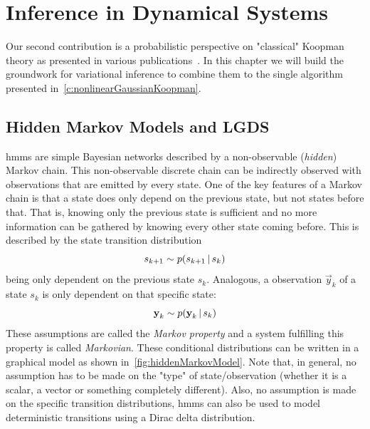 \chapter{Inference in Dynamical Systems}
\label{c:inferenceInDynamicalSystems}



Our second contribution is a probabilistic perspective on "classical" Koopman theory as presented in various publications~\cite{bruntonKoopmanInvariantSubspaces2016,hanDeepLearningKoopman2020,kaiserDatadrivenDiscoveryKoopman2020,luschDeepLearningUniversal2018,williamsDataDrivenApproximation2015}. In this chapter we will build the groundwork for variational inference to combine them to the single \algname algorithm presented in~\autoref{c:nonlinearGaussianKoopman}.

\section{Hidden Markov Models and LGDS}
	\acp{hmm} are simple Bayesian networks described by a non-observable (\emph{hidden}) Markov chain. This non-observable discrete chain can be indirectly observed with observations that are emitted by every state. One of the key features of a Markov chain is that a state does only depend on the previous state, but not states before that. That is, knowing only the previous state is sufficient and no more information can be gathered by knowing every other state coming before. This is described by the state transition distribution
	\begin{equation*}
		s_{k + 1} \sim p(s_{k + 1} \,\vert\, s_k)
	\end{equation*}
	being only dependent on the previous state \(s_k\). Analogous, a observation \(\vec{y}_k\) of a state \(s_k\) is only dependent on that specific state:
	\begin{equation*}
		\boldsymbol{\mathrm{y}}_k \sim p(\boldsymbol{\mathrm{y}}_k \,\vert\, s_k)
	\end{equation*}
	These assumptions are called the \emph{Markov property} and a system fulfilling this property is called \emph{Markovian}. These conditional distributions can be written in a graphical model as shown in~\autoref{fig:hiddenMarkovModel}. Note that, in general, no assumption has to be made on the "type" of state/observation (\ie whether it is a scalar, a vector or something completely different). Also, no assumption is made on the specific transition distributions, \acp{hmm} can also be used to model deterministic transitions using a Dirac delta distribution.

